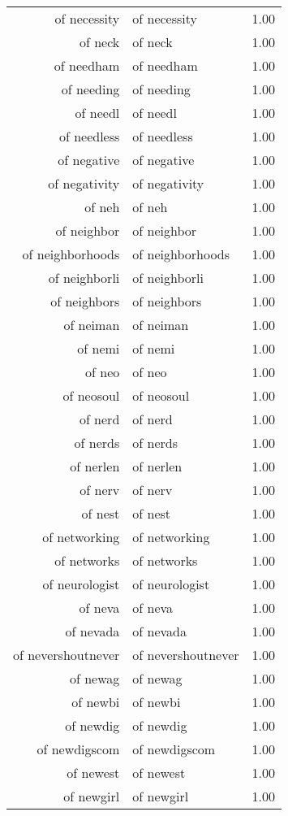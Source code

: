 \begin{table}[ht]
\begin{tabular}{rlr}
  of necessity & of necessity & 1.00 \\ 
  of neck & of neck & 1.00 \\ 
  of needham & of needham & 1.00 \\ 
  of needing & of needing & 1.00 \\ 
  of needl & of needl & 1.00 \\ 
  of needless & of needless & 1.00 \\ 
  of negative & of negative & 1.00 \\ 
  of negativity & of negativity & 1.00 \\ 
  of neh & of neh & 1.00 \\ 
  of neighbor & of neighbor & 1.00 \\ 
  of neighborhoods & of neighborhoods & 1.00 \\ 
  of neighborli & of neighborli & 1.00 \\ 
  of neighbors & of neighbors & 1.00 \\ 
  of neiman & of neiman & 1.00 \\ 
  of nemi & of nemi & 1.00 \\ 
  of neo & of neo & 1.00 \\ 
  of neosoul & of neosoul & 1.00 \\ 
  of nerd & of nerd & 1.00 \\ 
  of nerds & of nerds & 1.00 \\ 
  of nerlen & of nerlen & 1.00 \\ 
  of nerv & of nerv & 1.00 \\ 
  of nest & of nest & 1.00 \\ 
  of networking & of networking & 1.00 \\ 
  of networks & of networks & 1.00 \\ 
  of neurologist & of neurologist & 1.00 \\ 
  of neva & of neva & 1.00 \\ 
  of nevada & of nevada & 1.00 \\ 
  of nevershoutnever & of nevershoutnever & 1.00 \\ 
  of newag & of newag & 1.00 \\ 
  of newbi & of newbi & 1.00 \\ 
  of newdig & of newdig & 1.00 \\ 
  of newdigscom & of newdigscom & 1.00 \\ 
  of newest & of newest & 1.00 \\ 
  of newgirl & of newgirl & 1.00 \\ 

\end{tabular}
\end{table}
